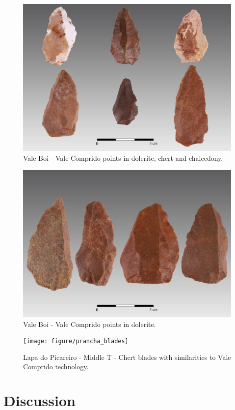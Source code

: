 \documentclass[12pt,twoside]{reedthesis}
\begin{document}
\begin{figure}

{\centering \includegraphics[width=0.7\linewidth]{figure/prancha_vct} 

}

\caption{Vale Boi - Vale Comprido points in dolerite, chert and chalcedony.}\label{fig:vct}
\end{figure}
\begin{figure}

{\centering \includegraphics[width=0.7\linewidth]{figure/prancha_vct2} 

}

\caption{Vale Boi - Vale Comprido points in dolerite.}\label{fig:vct2}
\end{figure}
\begin{figure}

{\centering \texttt{[image: figure/prancha\_blades]} 

}

\caption{Lapa do Picareiro - Middle T - Chert blades with similarities to Vale Comprido technology.}\label{fig:lpblades}
\end{figure}
\hypertarget{discussion}{%
\chapter{Discussion}\label{discussion}}
\end{document}

